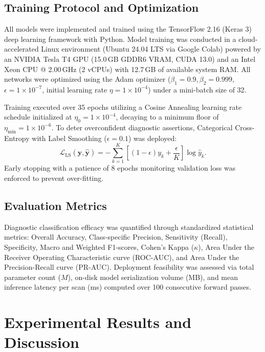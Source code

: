 \documentclass[journal]{IEEEtran}
\begin{document}
\subsection{Training Protocol and Optimization}
All models were implemented and trained using the TensorFlow 2.16 (Keras 3) deep learning framework with Python. Model training was conducted in a cloud-accelerated Linux environment (Ubuntu 24.04 LTS via Google Colab) powered by an NVIDIA Tesla T4 GPU (15.0\,GB GDDR6 VRAM, CUDA 13.0) and an Intel Xeon CPU @ 2.00\,GHz (2 vCPUs) with 12.7\,GB of available system RAM. All networks were optimized using the Adam optimizer ($\beta_1 = 0.9, \beta_2 = 0.999$, $\epsilon = 1\times 10^{-7}$, initial learning rate $\eta = 1\times 10^{-4}$) under a mini-batch size of 32. 

Training executed over 35 epochs utilizing a Cosine Annealing learning rate schedule initialized at $\eta_0 = 1\times 10^{-4}$, decaying to a minimum floor of $\eta_{\min} = 1\times 10^{-6}$. To deter overconfident diagnostic assertions, Categorical Cross-Entropy with Label Smoothing ($\epsilon=0.1$) was deployed:
\begin{equation}
\mathcal{L}_{\text{LS}}(\mathbf{y}, \hat{\mathbf{y}}) = -\sum_{k=1}^K \left[ (1 - \epsilon)y_k + \frac{\epsilon}{K} \right] \log \hat{y}_k.
\label{eq:label_smoothing}
\end{equation}
Early stopping with a patience of 8 epochs monitoring validation loss was enforced to prevent over-fitting.

\subsection{Evaluation Metrics}
Diagnostic classification efficacy was quantified through standardized statistical metrics: Overall Accuracy, Class-specific Precision, Sensitivity (Recall), Specificity, Macro and Weighted F1-scores, Cohen's Kappa ($\kappa$), Area Under the Receiver Operating Characteristic curve (ROC-AUC), and Area Under the Precision-Recall curve (PR-AUC). Deployment feasibility was assessed via total parameter count ($M$), on-disk model serialization volume (MB), and mean inference latency per scan (ms) computed over 100 consecutive forward passes.

\section{Experimental Results and Discussion}
\end{document}
